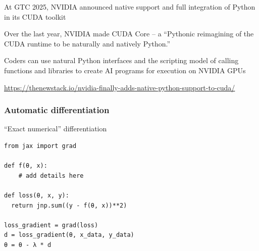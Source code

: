 \begin{frame}

    \textbf{}
    
    \vspace{0.5em}
    At GTC 2025, NVIDIA announced native support and full integration of Python in its CUDA toolkit


    \vspace{0.5em}
    Over the last year, NVIDIA made CUDA Core -- a ``Pythonic
    reimagining of the CUDA runtime to be naturally and natively Python.''

    \vspace{0.5em}
    Coders can use natural Python interfaces and the scripting model of calling
    functions and libraries to create AI programs for execution on NVIDIA
    GPUs

    \vspace{0.5em}
    \vspace{0.5em}
    \vspace{0.5em}

    \footnotesize{
        \url{https://thenewstack.io/nvidia-finally-adds-native-python-support-to-cuda/}
    }

\end{frame}


\begin{frame}[fragile]
    \frametitle{Automatic differentiation}

    \vspace{0.5em}
    ``Exact numerical'' differentiation
    
    \begin{verbatim}
from jax import grad

def f(θ, x):
    # add details here

def loss(θ, x, y):
  return jnp.sum((y - f(θ, x))**2)

loss_gradient = grad(loss)
d = loss_gradient(θ, x_data, y_data)
θ = θ - λ * d

    \end{verbatim}

\end{frame}


